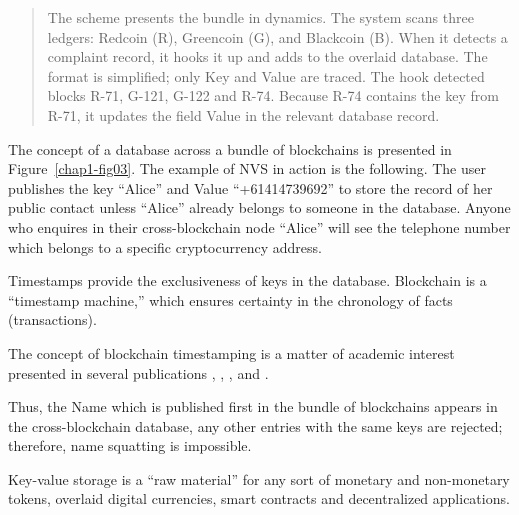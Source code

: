 \begin{multicols}{2}

\vspace{-.6cm}

\begin{quote}
The scheme presents the bundle in dynamics. The system scans three ledgers: Redcoin (R), Greencoin (G), and Blackcoin (B). When it detects a complaint record, it hooks it up and adds to the overlaid database. The format is simplified; only Key and Value are traced. The hook detected blocks R-71, G-121, G-122 and R-74. Because R-74 contains the key from R-71, it updates the field Value in the relevant database record. 
\end{quote}

\vspace{-.4cm}
The concept of a database across a bundle of blockchains is presented in Figure~\ref{chap1-fig03}. The example of NVS in action is the following. The user publishes the key “Alice” and Value “+61414739692” to store the record of her public contact unless “Alice” already belongs to someone in the database. Anyone who enquires in their cross-blockchain node “Alice” will see the telephone number which belongs to a specific cryptocurrency address.

\vspace{-.1cm}

Timestamps provide the exclusiveness of keys in the database. Blockchain is a “timestamp machine,” which ensures certainty in the chronology of facts (transactions). 

\vspace{-.1cm}

The concept of blockchain timestamping is a matter of academic interest presented in several publications \cite{art1-key29}, \cite{art1-key30}, \cite{art1-key31}, \cite{art1-key32} and \cite{art1-key33}.

\vspace{-.1cm}

Thus, the Name which is published first in the bundle of blockchains appears in the cross-blockchain database, any other entries with the same keys are rejected; therefore, name squatting is impossible.

\vspace{-.1cm}

Key-value storage is a “raw material” for any sort of monetary and non-monetary tokens, overlaid digital currencies, smart contracts and decentralized applications.

\vspace{-.1cm}


\end{multicols}
